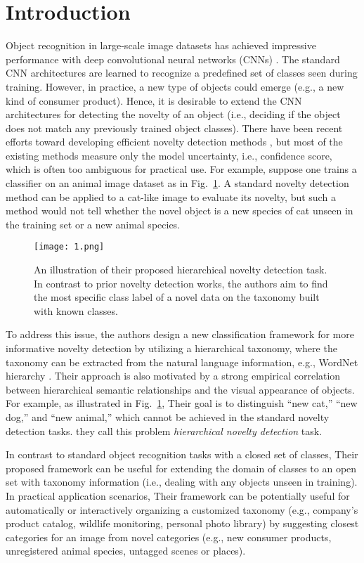 \documentclass[10pt,twocolumn,letterpaper]{article}
\begin{document}
\section{Introduction}
Object recognition in large-scale image datasets has
achieved impressive performance with deep convolutional
neural networks (CNNs) \cite{he2015delving,he2016deep,simonyan2014very,szegedy2015going}. The standard
CNN architectures are learned to recognize a predefined set
of classes seen during training. However, in practice, a new
type of objects could emerge (e.g., a new kind of consumer
product). Hence, it is desirable to extend the CNN architectures for detecting the novelty of an object (i.e., deciding
if the object does not match any previously trained object
classes). There have been recent efforts toward developing
efficient novelty detection methods \cite{bendale2016towards}, but
most of the existing methods measure only the model uncertainty, i.e., confidence score, which is often too ambiguous
for practical use. For example, suppose one trains a classifier on an animal image dataset as in Fig.~\ref{fig1}.
A standard novelty detection method can be applied to a cat-like image to evaluate its novelty, but such a method would not tell
whether the novel object is a new species of cat unseen in
the training set or a new animal species.
%
\begin{figure}
\centering
\texttt{[image: 1.png]}
\caption{An illustration of their proposed hierarchical novelty detection task. In contrast to prior novelty detection
	works, the authors aim to find the most specific class label of a novel
	data on the taxonomy built with known classes.}
\label{fig1}
\end{figure}
%
\par
To address this issue, the authors design a new classification
framework for more informative novelty detection by utilizing a hierarchical taxonomy, where the taxonomy can
be extracted from the natural language information, e.g.,
WordNet hierarchy \cite{miller1995wordnet}. Their approach is also motivated by
a strong empirical correlation between hierarchical semantic relationships and the visual appearance of objects.
For example, as illustrated in Fig.~\ref{fig1}, Their goal is to distinguish ``new cat,'' ``new dog,'' and ``new animal,'' which
cannot be achieved in the standard novelty detection tasks.
they call this problem \textit{hierarchical novelty detection} task.
\par
In contrast to standard object recognition tasks with a
closed set of classes, Their proposed framework can be useful
for extending the domain of classes to an open set with taxonomy information (i.e., dealing with any objects unseen in training). In practical application scenarios, Their framework
can be potentially useful for automatically or interactively
organizing a customized taxonomy (e.g., company’s product catalog, wildlife monitoring, personal photo library) by suggesting closest categories for an image from novel categories (e.g., new consumer products, unregistered animal
species, untagged scenes or places).
\end{document}
